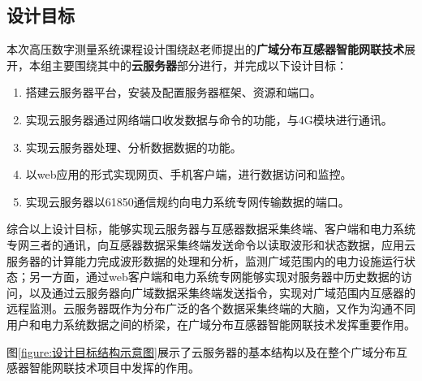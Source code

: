 \documentclass[a4paper,11pt]{ctexart}
\begin{document}
\newpage
\begin{spacing}{1.5}


\section{设计目标}
\par
本次高压数字测量系统课程设计围绕赵老师提出的\textbf{广域分布互感器智能网联技术}展开，本组主要围绕其中的\textbf{云服务器}部分进行，并完成以下设计目标：
\begin{enumerate}[1.,topsep=0pt]
	\setlength{\itemsep}{-0.25\baselineskip}
	\item 搭建云服务器平台，安装及配置服务器框架、资源和端口。
	\item 实现云服务器通过网络端口收发数据与命令的功能，与4G模块进行通讯。
	\item 实现云服务器处理、分析数据数据的功能。
	\item 以web应用的形式实现网页、手机客户端，进行数据访问和监控。
	\item 实现云服务器以61850通信规约向电力系统专网传输数据的端口。
\end{enumerate}
\par
综合以上设计目标，能够实现云服务器与互感器数据采集终端、客户端和电力系统专网三者的通讯，向互感器数据采集终端发送命令以读取波形和状态数据，应用云服务器的计算能力完成波形数据的处理和分析，监测广域范围内的电力设施运行状态；另一方面，通过web客户端和电力系统专网能够实现对服务器中历史数据的访问，以及通过云服务器向广域数据采集终端发送指令，实现对广域范围内互感器的远程监测。云服务器既作为分布广泛的各个数据采集终端的大脑，又作为沟通不同用户和电力系统数据之间的桥梁，在广域分布互感器智能网联技术发挥重要作用。
\par
图\ref{figure:设计目标结构示意图}展示了云服务器的基本结构以及在整个广域分布互感器智能网联技术项目中发挥的作用。
\begin{figure}[h]
	\centering
	\setlength{\abovecaptionskip}{4mm}
	\setlength{\belowcaptionskip}{-4mm}
\end{figure}
\end{spacing}
\end{document}

